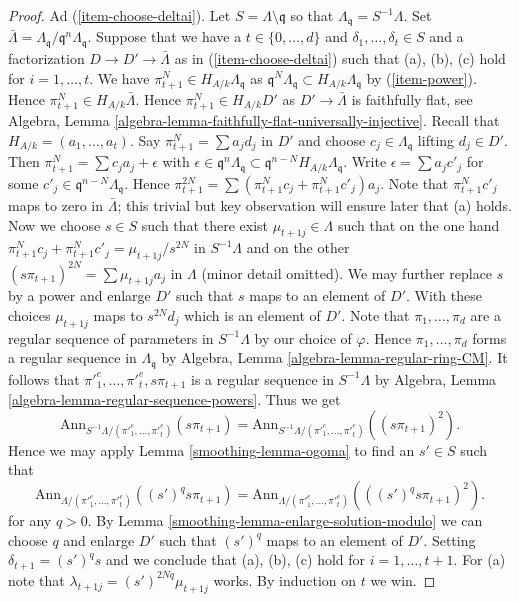 \begin{proof}
\medskip\noindent
Ad (\ref{item-choose-deltai}). Let $S = \Lambda \setminus \mathfrak q$
so that $\Lambda_\mathfrak q = S^{-1}\Lambda$. Set
$\bar \Lambda = \Lambda_\mathfrak q/\mathfrak q^n \Lambda_\mathfrak q$.
Suppose that we have a $t \in \{0, \ldots, d\}$ and
$\delta_1, \ldots, \delta_t \in S$ and a factorization
$D \to D' \to \bar \Lambda$ as in (\ref{item-choose-deltai})
such that (a), (b), (c) hold for $i = 1, \ldots, t$. We have
$\pi_{t + 1}^N \in H_{A/k}\Lambda_\mathfrak q$
as $\mathfrak q^N \Lambda_\mathfrak q \subset H_{A/k}\Lambda_\mathfrak q$
by (\ref{item-power}). Hence
$\pi_{t + 1}^N \in H_{A/k} \bar\Lambda$. Hence
$\pi_{t + 1}^N \in H_{A/k}D'$ as $D' \to \bar \Lambda$
is faithfully flat, see
Algebra, Lemma \ref{algebra-lemma-faithfully-flat-universally-injective}.
Recall that $H_{A/k} = (a_1, \ldots, a_t)$.
Say $\pi_{t + 1}^N = \sum a_j d_j$ in $D'$ and choose
$c_j \in \Lambda_\mathfrak q$ lifting $d_j \in D'$. Then
$\pi_{t + 1}^N = \sum c_j a_j + \epsilon$ with
$\epsilon \in \mathfrak q^n\Lambda_\mathfrak q \subset
\mathfrak q^{n - N}H_{A/k}\Lambda_\mathfrak q$.
Write $\epsilon = \sum a_j c'_j$ for some
$c'_j \in \mathfrak q^{n - N}\Lambda_\mathfrak q$.
Hence $\pi_{t + 1}^{2N} = \sum (\pi_{t + 1}^N c_j + \pi_{t + 1}^N c'_j) a_j$.
Note that $\pi_{t + 1}^Nc'_j$ maps to zero in $\bar \Lambda$; this trivial
but key observation will ensure later that (a) holds.
Now we choose $s \in S$ such that there exist
$\mu_{t + 1j} \in \Lambda$ such that on the one hand
$\pi_{t + 1}^N c_j + \pi_{t + 1}^N c'_j = \mu_{t + 1j}/s^{2N}$
in $S^{-1}\Lambda$ and on the other
$(s \pi_{t + 1})^{2N} = \sum \mu_{t + 1j}a_j$
in $\Lambda$ (minor detail omitted). We may further replace $s$ by
a power and enlarge $D'$ such that $s$ maps to an element of $D'$.
With these choices $\mu_{t + 1j}$ maps to $s^{2N}d_j$ which is
an element of $D'$. Note that $\pi_1, \ldots, \pi_d$ are a regular
sequence of parameters in $S^{-1}\Lambda$ by our
choice of $\varphi$. Hence $\pi_1, \ldots, \pi_d$ forms a regular sequence
in $\Lambda_\mathfrak q$ by
Algebra, Lemma \ref{algebra-lemma-regular-ring-CM}.
It follows that ${\pi'}_1^e, \ldots, {\pi'}_t^e, s\pi_{t + 1}$ is a
regular sequence in $S^{-1}\Lambda$ by
Algebra, Lemma \ref{algebra-lemma-regular-sequence-powers}.
Thus we get
$$
\text{Ann}_{S^{-1}\Lambda/({\pi'}_1^e, \ldots, {\pi'}_t^e)}(s\pi_{t + 1}) =
\text{Ann}_{S^{-1}\Lambda/({\pi'}_1^e, \ldots, {\pi'}_t^e)}((s\pi_{t + 1})^2).
$$
Hence we may apply Lemma \ref{smoothing-lemma-ogoma} to find an $s' \in S$
such that
$$
\text{Ann}_{\Lambda/({\pi'}_1^e, \ldots, {\pi'}_t^e)}((s')^qs\pi_{t + 1})
=
\text{Ann}_{\Lambda/({\pi'}_1^e, \ldots, {\pi'}_t^e)}(((s')^qs\pi_{t + 1})^2).
$$
for any $q > 0$. By Lemma \ref{smoothing-lemma-enlarge-solution-modulo}
we can choose $q$ and enlarge $D'$ such that $(s')^q$ maps to an element
of $D'$. Setting $\delta_{t + 1} = (s')^qs$ and we conclude that
(a), (b), (c) hold for $i = 1, \ldots, t + 1$. For (a) note that
$\lambda_{t + 1j} = (s')^{2Nq}\mu_{t + 1j}$ works.
By induction on $t$ we win.


\end{proof}
